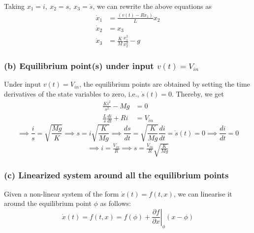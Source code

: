 Taking \( x_1 = i, \ x_2 = s, \ x_3 = \dot s \), we can rewrite the above equations as
\begin{align*}
    \dot x_1 & = \frac{(v(t) - R x_1)}{L} x_2        \\
    \dot x_2 & = x_3                                 \\
    \dot x_3 & = \frac{K}{M} \frac{x_1^2}{x_2^2} - g
\end{align*}

\subsubsection*{(b) Equilibrium point(s) under input \(v(t)=V_{in}\)}

Under input \( v(t)=V_{in} \), the equilibrium points are obtained by setting the time derivatives of the state variables to zero, i.e., \( \dot s(t) = 0 \).
Thereby, we get
\begin{align*}
    \frac{Ki^2}{s^2} - Mg         & = 0      \\
    \frac{L}{s}\frac{di}{dt} + Ri & = V_{in}
\end{align*}
\begin{equation*}
    \implies
    \frac{i}{s} = \sqrt{\frac{Mg}{K}}
    \implies
    s = i \sqrt{\frac{K}{Mg}}
    \implies
    \frac{ds}{dt} = \sqrt{\frac{K}{Mg}} \frac{di}{dt} = \dot s(t) = 0
    \implies
    \frac{di}{dt} = 0
\end{equation*}
\begin{align*}
    \implies
    i = \frac{V_{in}}{R}
    \implies
    \boxed{
        s = \frac{V_{in}}{R} \sqrt{\frac{K}{Mg}}
    }
\end{align*}

\subsubsection*{(c) Linearized system around all the equilibrium points}

Given a non-linear system of the form \( \dot x(t) = f(t, x) \), we can linearise it around the equilibrium point \( \phi \) as follows:
\[
    \dot x(t) = f(t, x) = f(\phi) + \left. \frac{\partial f}{\partial x} \right|_{\phi} (x - \phi)
\]
